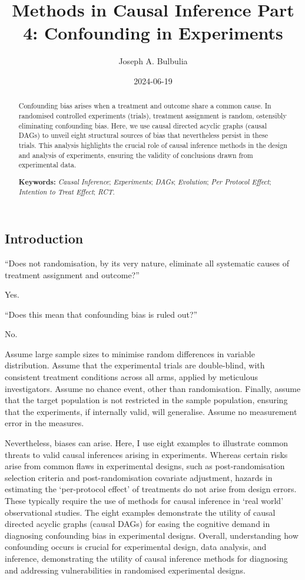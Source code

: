 \documentclass[
  single column]{article}
\title{Methods in Causal Inference Part 4: Confounding in Experiments}
\author{Joseph A. Bulbulia}
\affil{%
             \small{     Victoria University of Wellington, New Zealand
          ORCID \textcolor[HTML]{A6CE39}{\aiOrcid} ~0000-0002-5861-2056 }
              }
\date{2024-06-19}
\begin{document}
\maketitle
\begin{abstract}
Confounding bias arises when a treatment and outcome share a common
cause. In randomised controlled experiments (trials), treatment
assignment is random, ostensibly eliminating confounding bias. Here, we
use causal directed acyclic graphs (causal DAGs) to unveil eight
structural sources of bias that nevertheless persist in these trials.
This analysis highlights the crucial role of causal inference methods in
the design and analysis of experiments, ensuring the validity of
conclusions drawn from experimental data.

\textbf{Keywords:} \emph{Causal Inference}; \emph{Experiments};
\emph{DAGs}; \emph{Evolution}; \emph{Per Protocol Effect};
\emph{Intention to Treat Effect}; \emph{RCT}.
\end{abstract}

\subsection{Introduction}\label{introduction}

``Does not randomisation, by its very nature, eliminate all systematic
causes of treatment assignment and outcome?''

Yes.

``Does this mean that confounding bias is ruled out?''

No.

Assume large sample sizes to minimise random differences in variable
distribution. Assume that the experimental trials are double-blind, with
consistent treatment conditions across all arms, applied by meticulous
investigators. Assume no chance event, other than randomisation.
Finally, assume that the target population is not restricted in the
sample population, ensuring that the experiments, if internally valid,
will generalise. Assume no measurement error in the measures.

Nevertheless, biases can arise. Here, I use eight examples to illustrate
common threats to valid causal inferences arising in experiments.
Whereas certain risks arise from common flaws in experimental designs,
such as post-randomisation selection criteria and post-randomisation
covariate adjustment, hazards in estimating the `per-protocol effect' of
treatments do not arise from design errors. These typically require the
use of methods for causal inference in `real world' observational
studies. The eight examples demonstrate the utility of causal directed
acyclic graphs (causal DAGs) for easing the cognitive demand in
diagnosing confounding bias in experimental designs. Overall,
understanding how confounding occurs is crucial for experimental design,
data analysis, and inference, demonstrating the utility of causal
inference methods for diagnosing and addressing vulnerabilities in
randomised experimental designs.
\end{document}
